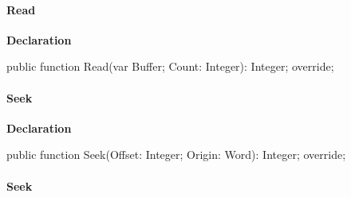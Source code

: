 \documentclass{report}
\newif\ifpdf
\begin{document}
\paragraph*{Read}\hspace*{\fill}

\label{PasDoc_StreamUtils.TBufferedStream-Read}
\begin{list}{}{
\setlength{\itemindent}{0cm}
\setlength{\listparindent}{0cm}
\setlength{\leftmargin}{\evensidemargin}
\addtolength{\leftmargin}{\tmplength}
\settowidth{\labelsep}{X}
\addtolength{\leftmargin}{\labelsep}
\setlength{\labelwidth}{\tmplength}
}
\item[\textbf{Declaration}\hfill]
\ifpdf
\begin{flushleft}
\fi
\begin{ttfamily}
public function Read(var Buffer; Count: Integer): Integer; override;\end{ttfamily}

\ifpdf
\end{flushleft}
\fi

\end{list}
\paragraph*{Seek}\hspace*{\fill}

\label{PasDoc_StreamUtils.TBufferedStream-Seek}
\begin{list}{}{
\setlength{\itemindent}{0cm}
\setlength{\listparindent}{0cm}
\setlength{\leftmargin}{\evensidemargin}
\addtolength{\leftmargin}{\tmplength}
\settowidth{\labelsep}{X}
\addtolength{\leftmargin}{\labelsep}
\setlength{\labelwidth}{\tmplength}
}
\item[\textbf{Declaration}\hfill]
\ifpdf
\begin{flushleft}
\fi
\begin{ttfamily}
public function Seek(Offset: Integer; Origin: Word): Integer; override;\end{ttfamily}

\ifpdf
\end{flushleft}
\fi

\end{list}
\paragraph*{Seek}\hspace*{\fill}
\end{document}
